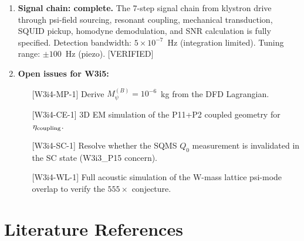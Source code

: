 \documentclass[11pt,twocolumn]{article}
\newcommand{\Mpsi}{M_\psi}
\newcommand{\ee}[1]{\times 10^{#1}}
\theoremstyle{definition}
\theoremstyle{remark}
\begin{document}
\begin{enumerate}
\item \textbf{Signal chain: complete.}
The 7-step signal chain from klystron drive through psi-field sourcing,
resonant coupling, mechanical transduction, SQUID pickup, homodyne
demodulation, and SNR calculation is fully specified.
Detection bandwidth: $5\ee{-7}$~Hz (integration limited).
Tuning range: $\pm 100$~Hz (piezo). [VERIFIED]

\item \textbf{Open issues for W3i5:}
\begin{enumerate}[nosep]
\item[{[W3i4-MP-1]}] Derive $\Mpsi^{(B)} = 10^{-6}$~kg from the DFD Lagrangian.
\item[{[W3i4-CE-1]}] 3D EM simulation of the P11+P2 coupled geometry for
  $\eta_{\rm coupling}$.
\item[{[W3i4-SC-1]}] Resolve whether the SQMS $Q_0$ measurement is
  invalidated in the SC state (W3i3\_P15 concern).
\item[{[W3i4-WL-1]}] Full acoustic simulation of the W-mass lattice
  psi-mode overlap to verify the $555\times$ conjecture.
\end{enumerate}

\end{enumerate}

\section*{Literature References}
\end{document}
